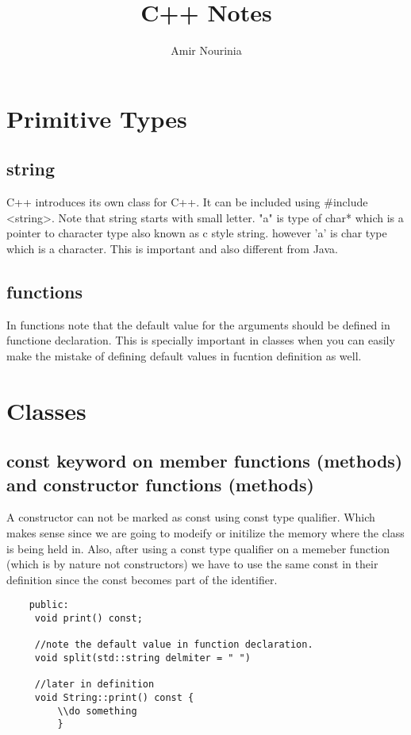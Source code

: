 \documentclass[11pt,twoside,a4paper]{report}
\author{Amir Nourinia}
\title{C++ Notes}
\begin{document}
\maketitle
\tableofcontents
\chapter{Primitive Types}

\section{string}
C++ introduces its own class for C++. It can be included using \#include <string>.
Note that string starts with small letter.
"a" is type of char* which is a pointer to character type also known as c style string.
however 'a' is char type which is a character. This is important and also different from Java.


\section{functions}
In functions note that the default value for the arguments should be defined in functione declaration. This is specially important in classes when you can easily make the mistake of defining default values in fucntion definition as well.

\chapter{Classes}
\section{const keyword on member functions (methods) and constructor functions (methods)}
A constructor can not be marked as const using const type qualifier. Which makes sense since we are going to modeify or initilize the memory where the class is being held in.
Also, after using a const type qualifier on a memeber function (which is by nature not constructors) we have to use the same const in their definition since the const becomes part of the
identifier.

\begin{lstlisting}
    public:
     void print() const;

     //note the default value in function declaration.
     void split(std::string delmiter = " ")

     //later in definition
     void String::print() const {
         \\do something
         }
\end{lstlisting}
\end{document}
